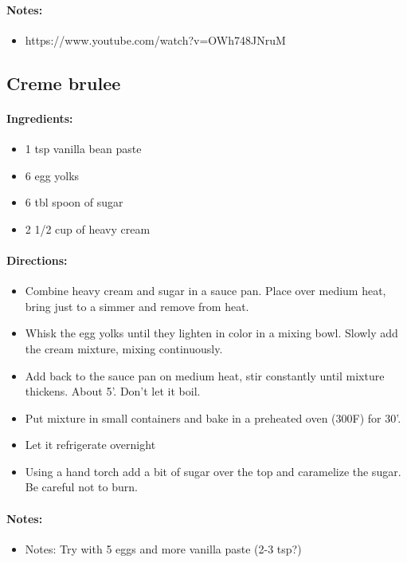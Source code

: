 \documentclass{article}
\begin{document}
\paragraph{Notes:}
\begin{itemize}
    \item https://www.youtube.com/watch?v=OWh748JNruM
\end{itemize}

\subsection{Creme brulee}

\paragraph{Ingredients:}
\begin{itemize}
    \item 1 tsp vanilla bean paste
    \item 6 egg yolks
    \item 6 tbl spoon of sugar
    \item 2 1/2 cup of heavy cream
\end{itemize}

\paragraph{Directions:}
\begin{itemize}
    \item Combine heavy cream and sugar in a sauce pan. Place over medium heat, bring just to a simmer and remove from heat.
    \item Whisk the egg yolks until they lighten in color in a mixing bowl. Slowly add the cream mixture, mixing continuously.
    \item Add back to the sauce pan on medium heat, stir constantly until mixture thickens. About 5'. Don't let it boil.
    \item Put mixture in small containers and bake in a preheated oven (300F) for 30'.
    \item Let it refrigerate overnight
    \item Using a hand torch add a bit of sugar over the top and caramelize the sugar. Be careful not to burn.
\end{itemize}

\paragraph{Notes:}
\begin{itemize}
    \item Notes: Try with 5 eggs and more vanilla paste (2-3 tsp?)
\end{itemize}
\end{document}
